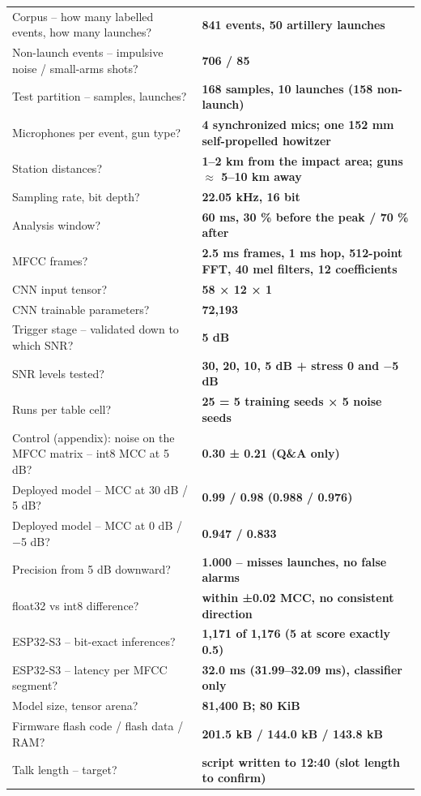 \documentclass[11pt,a4paper]{article}
\begin{document}
\medskip
\begin{tabular}{@{}p{} p{}@{}}
  \toprule
    Corpus – how many labelled events, how many launches? & \textbf{841 events, 50 artillery launches}\\
    Non-launch events – impulsive noise / small-arms shots? & \textbf{706 / 85}\\
    Test partition – samples, launches? & \textbf{168 samples, 10 launches (158 non-launch)}\\
    Microphones per event, gun type? & \textbf{4 synchronized mics; one 152 mm self-propelled howitzer}\\
    Station distances? & \textbf{1–2 km from the impact area; guns $\approx$ 5–10 km away}\\
    Sampling rate, bit depth? & \textbf{22.05 kHz, 16 bit}\\
    Analysis window? & \textbf{60 ms, 30 \% before the peak / 70 \% after}\\
    MFCC frames? & \textbf{2.5 ms frames, 1 ms hop, 512-point FFT, 40 mel filters, 12 coefficients}\\
    CNN input tensor? & \textbf{58 × 12 × 1}\\
    CNN trainable parameters? & \textbf{72,193}\\
    Trigger stage – validated down to which SNR? & \textbf{5 dB}\\
    SNR levels tested? & \textbf{30, 20, 10, 5 dB + stress 0 and $-$5 dB}\\
    Runs per table cell? & \textbf{25 = 5 training seeds × 5 noise seeds}\\
    Control (appendix): noise on the MFCC matrix – int8 MCC at 5 dB? & \textbf{0.30 ± 0.21 (Q\&A only)}\\
    Deployed model – MCC at 30 dB / 5 dB? & \textbf{0.99 / 0.98 (0.988 / 0.976)}\\
    Deployed model – MCC at 0 dB / $-$5 dB? & \textbf{0.947 / 0.833}\\
    Precision from 5 dB downward? & \textbf{1.000 – misses launches, no false alarms}\\
    float32 vs int8 difference? & \textbf{within ±0.02 MCC, no consistent direction}\\
    ESP32-S3 – bit-exact inferences? & \textbf{1,171 of 1,176 (5 at score exactly 0.5)}\\
    ESP32-S3 – latency per MFCC segment? & \textbf{32.0 ms (31.99–32.09 ms), classifier only}\\
    Model size, tensor arena? & \textbf{81,400 B; 80 KiB}\\
    Firmware flash code / flash data / RAM? & \textbf{201.5 kB / 144.0 kB / 143.8 kB}\\
    Talk length – target? & \textbf{script written to 12:40 (slot length to confirm)}\\
  \bottomrule
\end{tabular}
\end{document}
